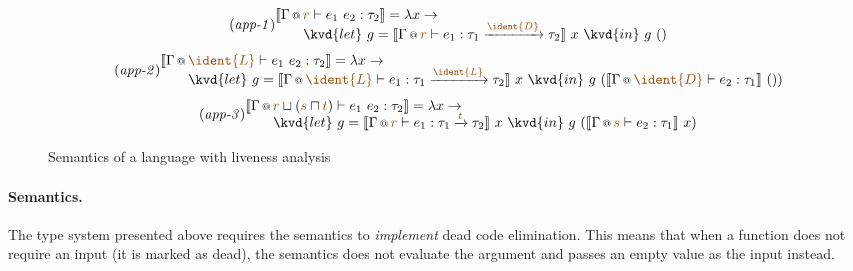 \begin{figure}
%
%
%
\begin{equation*}
\tag{\emph{app-1}}
\hspace{-0.5em}
\begin{array}{l}
  \sem{\coctx{\Gamma}{\aclrd{r}} \vdash e_1~e_2 : \tau_2 } = \lambda x \rightarrow \\[-0.25em]
  \qquad\kvd{let}~g=\sem{ \coctx{\Gamma}{\aclrd{r}} \vdash e_1 : \tau_1 \xrightarrow{\aclrd{ \ident{D} }} \tau_2 }~x
    ~\kvd{in}~g~()
\end{array}
\end{equation*}
\vspace{-1.0em}
\begin{equation*}
\tag{\emph{app-2}}
\hspace{-0.5em}
\begin{array}{l}
  \sem{\coctx{\Gamma}{\aclrd{\ident{L}}} \vdash e_1~e_2 : \tau_2 } = \lambda x \rightarrow \\[-0.25em]
  \qquad\kvd{let}~g=\sem{ \coctx{\Gamma}{\aclrd{ \ident{L} }} \vdash e_1 : \tau_1 \xrightarrow{\aclrd{ \ident{L} }} \tau_2 }~x
    ~\kvd{in}~g~(\sem{ \coctx{\Gamma}{\aclrd{ \ident{D} }} \vdash e_2 : \tau_1 }~())
\end{array}
\end{equation*}
\vspace{-1.0em}
\begin{equation*}
\tag{\emph{app-3}}
\hspace{-0.5em}
\begin{array}{l}
  \sem{\coctx{\Gamma}{\aclrd{r} \sqcup (\aclrd{s} \sqcap \aclrd{t}) } \vdash e_1~e_2 : \tau_2 } = \lambda x \rightarrow \\[-0.25em]
  \qquad\kvd{let}~g=\sem{ \coctx{\Gamma}{\aclrd{r}} \vdash e_1 : \tau_1 \xrightarrow{\aclrd{t}} \tau_2 }~x
    ~\kvd{in}~g~(\sem{ \coctx{\Gamma}{\aclrd{s}} \vdash e_2 : \tau_1 }~x)
\end{array}
\end{equation*}

\caption{Semantics of a language with liveness analysis}
\label{fig:applications-flat-livsem}
\end{figure}


\paragraph{Semantics.} 
The type system presented above requires the semantics to \emph{implement} dead code elimination.
This means that when a function does not require an input (it is marked as dead), the semantics
does not evaluate the argument and passes an empty value as the input instead.

